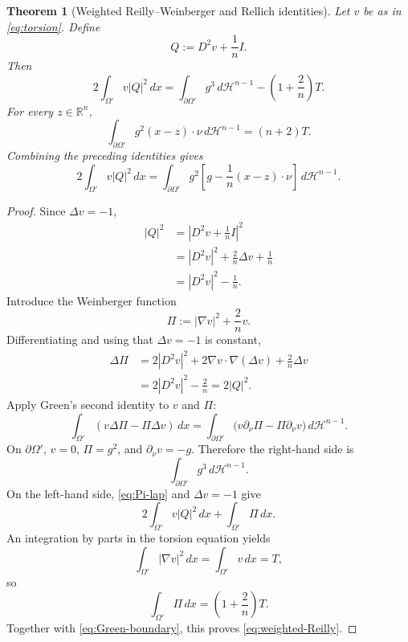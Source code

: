 \documentclass[11pt]{amsart}
\newtheorem{theorem}{Theorem}[section]
\theoremstyle{definition}
\newcommand{\R}{\mathbb R}
\newcommand{\Hn}{\mathcal H^{n-1}}
\newcommand{\Om}{\Omega}
\begin{document}
\begin{theorem}[Weighted Reilly--Weinberger and Rellich identities]
\label{thm:reilly-identities}
Let \(v\) be as in \eqref{eq:torsion}.  Define
\[
   Q:=D^2v+\frac1nI.
\]
Then
\[
   2\int_{\Om'}v|Q|^2\,dx
   =\int_{\partial\Om'}g^3\,d\Hn
     -\left(1+\frac2n\right)T.
\tag{5.6}\label{eq:weighted-Reilly}
\]
For every \(z\in\R^n\),
\[
   \int_{\partial\Om'}g^2(x-z)\cdot\nu\,d\Hn=(n+2)T.
\tag{5.7}\label{eq:Rellich}
\]
Combining the preceding identities gives
\[
   2\int_{\Om'}v|Q|^2\,dx
   =
   \int_{\partial\Om'}g^2
      \left[g-\frac1n(x-z)\cdot\nu\right]\,d\Hn.
\tag{5.8}\label{eq:combined}
\]
\end{theorem}

\begin{proof}
Since \(\Delta v=-1\),
\[
\begin{aligned}
   |Q|^2
   &=\left|D^2v+\frac1nI\right|^2 \\
   &=|D^2v|^2+\frac2n\Delta v+\frac1n \\
   &=|D^2v|^2-\frac1n.
\end{aligned}
\tag{5.9}\label{eq:Q-square}
\]
Introduce the Weinberger function
\[
   \Pi:=|\nabla v|^2+\frac2n v.
\]
Differentiating and using that \(\Delta v=-1\) is constant,
\[
\begin{aligned}
   \Delta\Pi
   &=2|D^2v|^2+2\nabla v\cdot\nabla(\Delta v)+\frac2n\Delta v \\
   &=2|D^2v|^2-\frac2n
    =2|Q|^2.
\end{aligned}
\tag{5.10}\label{eq:Pi-lap}
\]
Apply Green's second identity to \(v\) and \(\Pi\):
\[
   \int_{\Om'}(v\Delta\Pi-\Pi\Delta v)\,dx
   =
   \int_{\partial\Om'}
      \bigl(v\partial_\nu\Pi-\Pi\partial_\nu v\bigr)\,d\Hn.
\tag{5.11}\label{eq:Green-two}
\]
On \(\partial\Om'\), \(v=0\), \(\Pi=g^2\), and
\(\partial_\nu v=-g\).  Therefore the right-hand side is
\[
   \int_{\partial\Om'}g^3\,d\Hn.
\tag{5.12}\label{eq:Green-boundary}
\]
On the left-hand side, \eqref{eq:Pi-lap} and \(\Delta v=-1\) give
\[
   2\int_{\Om'}v|Q|^2\,dx+\int_{\Om'}\Pi\,dx.
\]
An integration by parts in the torsion equation yields
\[
   \int_{\Om'}|\nabla v|^2\,dx
   =\int_{\Om'}v\,dx=T,
\]
so
\[
   \int_{\Om'}\Pi\,dx
   =\left(1+\frac2n\right)T.
\]
Together with \eqref{eq:Green-boundary}, this proves
\eqref{eq:weighted-Reilly}.


\end{proof}
\end{document}
